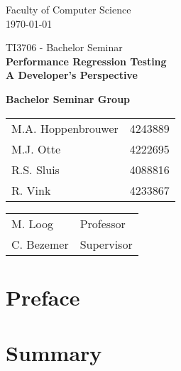 \documentclass[oneside]{book}
\begin{document}
\frontmatter

\begin{titlepage}

\begin{center}
\begin{figure}[h!]
\centering
\end{figure}
Faculty of Computer Science \\
\today

\vspace{3.5cm}
\selectfont
{\Large TI3706 - Bachelor Seminar}\\
\vspace{0.0cm}
\Huge{\textbf{Performance Regression Testing\\ A Developer's Perspective}}
\vspace{0.5cm}
\selectfont

\vspace{5cm}
\normalsize{\textbf{Bachelor Seminar Group}}

\begin{tabular}{ l r}
\normalsize{M.A. Hoppenbrouwer} & \normalsize{4243889} \\
\normalsize{M.J. Otte} & \normalsize{4222695} \\
\normalsize{R.S. Sluis} & \normalsize{4088816} \\
\normalsize{R. Vink} & \normalsize{4233867}\\
\end{tabular}

\vspace{0.75cm}

\begin{tabular}{ l l }
\normalsize{M. Loog} & \normalsize{Professor} \\
\normalsize{C. Bezemer} & \normalsize{Supervisor} \\
\end{tabular}

\end{center}
\end{titlepage}

\chapter{Preface}


\chapter{Summary}

\end{document}
